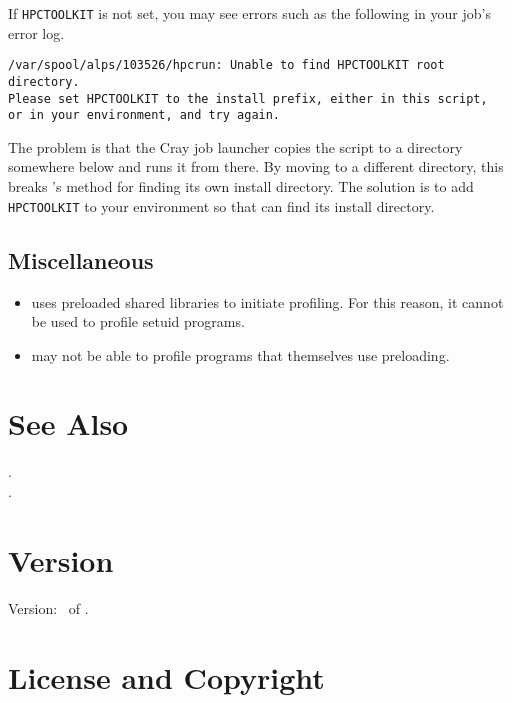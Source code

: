 \documentclass[english]{article}
\begin{document}
If \verb+HPCTOOLKIT+ is not set, you may see errors such as the
following in your job's error log.

\begin{verbatim}
/var/spool/alps/103526/hpcrun: Unable to find HPCTOOLKIT root directory.
Please set HPCTOOLKIT to the install prefix, either in this script,
or in your environment, and try again.
\end{verbatim}

The problem is that the Cray job launcher copies the 
script to a directory somewhere below  and runs
it from there.  By moving  to a different directory, this
breaks 's method for finding its own install directory.
The solution is to add \verb+HPCTOOLKIT+ to your environment so that
 can find its install directory.

\subsection{Miscellaneous}

\begin{itemize}
  \item {} uses preloaded shared libraries to initiate profiling.  For this reason, it cannot be used to profile setuid programs.
  \item {} may not be able to profile programs that themselves use preloading.
\end{itemize}


\section{See Also}

.\\
.


\section{Version}

Version: \Version\ of \Date.

\section{License and Copyright}
\end{document}
